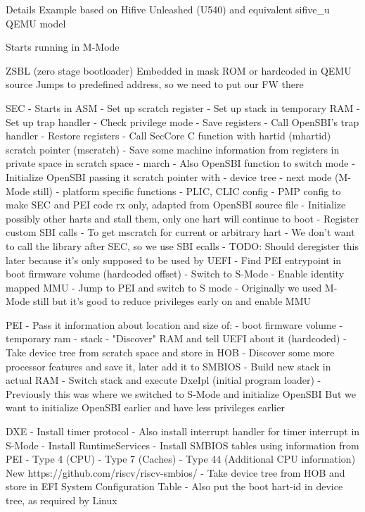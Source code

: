 \documentclass[
  10pt
]{beamer}
\begin{document}
\begin{frame}{Details}
Example based on Hifive Unleashed (U540) and equivalent sifive\_u QEMU model

Starts running in M-Mode

ZSBL (zero stage bootloader)
  Embedded in mask ROM or hardcoded in QEMU source
  Jumps to predefined address, so we need to put our FW there

SEC
  - Starts in ASM
  - Set up scratch register
  - Set up stack in temporary RAM
  - Set up trap handler
    - Check privilege mode
    - Save registers
    - Call OpenSBI's trap handler
    - Restore registers
  - Call SecCore C function with hartid (mhartid) scratch pointer (mscratch)
    - Save some machine information from registers in private space in scratch space
      - march
      - Also OpenSBI function to switch mode
  - Initialize OpenSBI passing it scratch pointer with
    - device tree %
    - next mode (M-Mode still)
    - platform specific functions
      - PLIC, CLIC config
      - PMP config to make SEC and PEI code rx only, adapted from OpenSBI source file
  - Initialize possibly other harts and stall them, only one hart will continue to boot
  - Register custom SBI calls
    - To get mscratch for current or arbitrary hart
    - We don't want to call the library after SEC, so we use SBI ecalls
    - TODO: Should deregister this later because it's only supposed to be used by UEFI
  - Find PEI entrypoint in boot firmware volume (hardcoded offset)
  - Switch to S-Mode
  - Enable identity mapped MMU
  - Jump to PEI and switch to S mode
    - Originally we used M-Mode still but it's good to reduce privileges early on and enable MMU

PEI
  - Pass it information about location and size of:
    - boot firmware volume
    - temporary ram
    - stack
  - "Discover" RAM and tell UEFI about it (hardcoded)
  - Take device tree from scratch space and store in HOB
  - Discover some more processor features and save it, later add it to SMBIOS
  - Build new stack in actual RAM
  - Switch stack and execute DxeIpl (initial program loader)
  - Previously this was where we switched to S-Mode and initialize OpenSBI
    But we want to initialize OpenSBI earlier and have less privileges earlier

DXE
  - Install timer protocol
    - Also install interrupt handler for timer interrupt in S-Mode
  - Install RuntimeServices
  - Install SMBIOS tables using information from PEI
   - Type 4 (CPU)
   - Type 7 (Caches)
   - Type 44 (Additional CPU information) New
     https://github.com/riscv/riscv-smbios/
  - Take device tree from HOB and store in EFI System Configuration Table
    - Also put the boot hart-id in device tree, as required by Linux


\end{frame}
\end{document}
